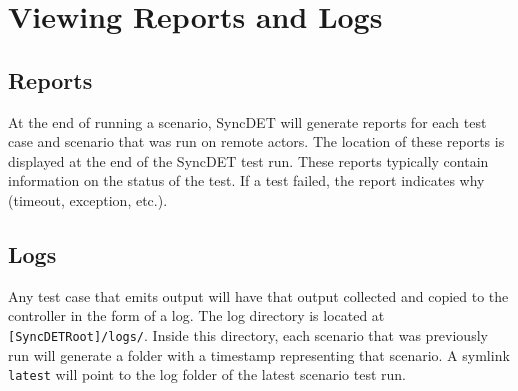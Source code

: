 \section{Viewing Reports and Logs}

\subsection{Reports}
At the end of running a scenario, SyncDET will generate reports for each test
case and scenario that was run on remote actors. The location of these reports
is displayed at the end of the SyncDET test run. These reports typically
contain information on the status of the test. If a test failed, the report
indicates why (timeout, exception, etc.).

\subsection{Logs}
Any test case that emits output will have that output collected and copied
to the controller in the form of a log. The log directory is located at
{\tt [SyncDETRoot]/logs/}. Inside this directory, each scenario that was
previously run will generate a folder with a timestamp representing that
scenario. A symlink {\tt latest} will point to the log folder of the latest
scenario test run.
